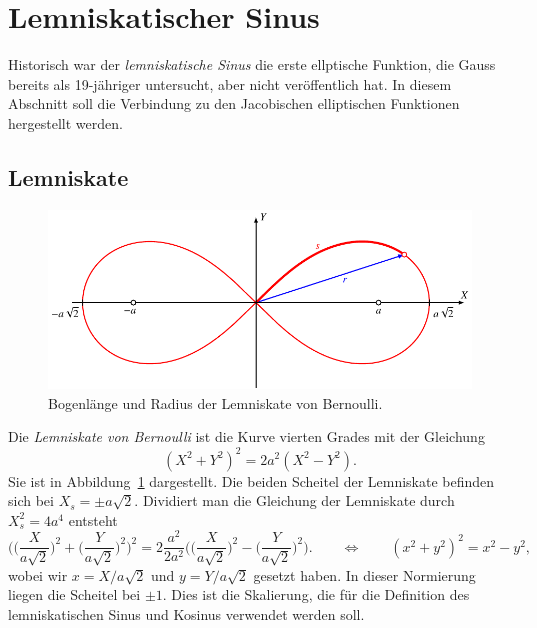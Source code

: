 %
%
%
\section{Lemniskatischer Sinus
\label{buch:elliptisch:section:lemniskate}}
Historisch war der {\em lemniskatische Sinus} die erste ellptische
Funktion, die Gauss bereits als 19-jähriger untersucht, aber nicht 
veröffentlich hat.
In diesem Abschnitt soll die Verbindung zu den Jacobischen
elliptischen Funktionen hergestellt werden.

\subsection{Lemniskate
\label{buch:gemotrie:subsection:lemniskate}}
\begin{figure}
\centering
\includegraphics{chapters/110-elliptisch/images/lemniskate.pdf}
\caption{Bogenlänge und Radius der Lemniskate von Bernoulli.
\label{buch:elliptisch:fig:lemniskate}}
\end{figure}
Die {\em Lemniskate von Bernoulli} ist die Kurve vierten Grades
mit der Gleichung
%
\begin{equation}
(X^2+Y^2)^2 = 2a^2(X^2-Y^2).
\label{buch:elliptisch:eqn:lemniskate}
\end{equation}
Sie ist in Abbildung~\ref{buch:elliptisch:fig:lemniskate}
dargestellt.
Die beiden Scheitel der Lemniskate befinden sich bei $X_s=\pm a\sqrt{2}$.
Dividiert man die Gleichung der Lemniskate durch $X_s^2=4a^4$ entsteht 
\begin{equation}
\biggl(
\biggl(\frac{X}{a\sqrt{2}}\biggr)^2
+
\biggl(\frac{Y}{a\sqrt{2}}\biggr)^2
\biggr)^2
=
2\frac{a^2}{2a^2}\biggl(
\biggl(\frac{X}{a\sqrt{2}}\biggr)^2
-
\biggl(\frac{Y}{a\sqrt{2}}\biggr)^2
\biggr).
\qquad
\Leftrightarrow
\qquad
(x^2+y^2)^2 = x^2-y^2,
\label{buch:elliptisch:eqn:lemniskatenormiert}
\end{equation}
wobei wir $x=X/a\sqrt{2}$ und $y=Y/a\sqrt{2}$ gesetzt haben.
In dieser Normierung liegen die Scheitel bei $\pm 1$.
Dies ist die Skalierung, die für die Definition des lemniskatischen
Sinus und Kosinus verwendet werden soll.

